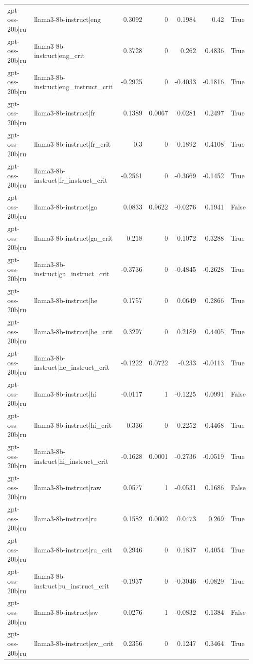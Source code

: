 \begin{table}
\begin{tabular}{l l r r r r l}
gpt-oss-20b|ru & llama3-8b-instruct|eng & 0.3092 & 0 & 0.1984 & 0.42 & True \\
gpt-oss-20b|ru & llama3-8b-instruct|eng_crit & 0.3728 & 0 & 0.262 & 0.4836 & True \\
gpt-oss-20b|ru & llama3-8b-instruct|eng_instruct_crit & -0.2925 & 0 & -0.4033 & -0.1816 & True \\
gpt-oss-20b|ru & llama3-8b-instruct|fr & 0.1389 & 0.0067 & 0.0281 & 0.2497 & True \\
gpt-oss-20b|ru & llama3-8b-instruct|fr_crit & 0.3 & 0 & 0.1892 & 0.4108 & True \\
gpt-oss-20b|ru & llama3-8b-instruct|fr_instruct_crit & -0.2561 & 0 & -0.3669 & -0.1452 & True \\
gpt-oss-20b|ru & llama3-8b-instruct|ga & 0.0833 & 0.9622 & -0.0276 & 0.1941 & False \\
gpt-oss-20b|ru & llama3-8b-instruct|ga_crit & 0.218 & 0 & 0.1072 & 0.3288 & True \\
gpt-oss-20b|ru & llama3-8b-instruct|ga_instruct_crit & -0.3736 & 0 & -0.4845 & -0.2628 & True \\
gpt-oss-20b|ru & llama3-8b-instruct|he & 0.1757 & 0 & 0.0649 & 0.2866 & True \\
gpt-oss-20b|ru & llama3-8b-instruct|he_crit & 0.3297 & 0 & 0.2189 & 0.4405 & True \\
gpt-oss-20b|ru & llama3-8b-instruct|he_instruct_crit & -0.1222 & 0.0722 & -0.233 & -0.0113 & True \\
gpt-oss-20b|ru & llama3-8b-instruct|hi & -0.0117 & 1 & -0.1225 & 0.0991 & False \\
gpt-oss-20b|ru & llama3-8b-instruct|hi_crit & 0.336 & 0 & 0.2252 & 0.4468 & True \\
gpt-oss-20b|ru & llama3-8b-instruct|hi_instruct_crit & -0.1628 & 0.0001 & -0.2736 & -0.0519 & True \\
gpt-oss-20b|ru & llama3-8b-instruct|raw & 0.0577 & 1 & -0.0531 & 0.1686 & False \\
gpt-oss-20b|ru & llama3-8b-instruct|ru & 0.1582 & 0.0002 & 0.0473 & 0.269 & True \\
gpt-oss-20b|ru & llama3-8b-instruct|ru_crit & 0.2946 & 0 & 0.1837 & 0.4054 & True \\
gpt-oss-20b|ru & llama3-8b-instruct|ru_instruct_crit & -0.1937 & 0 & -0.3046 & -0.0829 & True \\
gpt-oss-20b|ru & llama3-8b-instruct|sw & 0.0276 & 1 & -0.0832 & 0.1384 & False \\
gpt-oss-20b|ru & llama3-8b-instruct|sw_crit & 0.2356 & 0 & 0.1247 & 0.3464 & True \\

\end{tabular}
\end{table}
